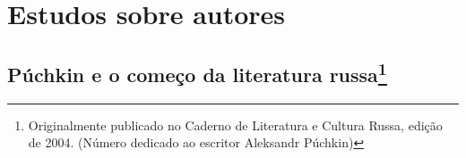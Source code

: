 















\part{Estudos sobre autores}

\chapter{Púchkin e o começo da literatura russa\footnote{Originalmente publicado no Caderno de Literatura e Cultura Russa, edição de 2004. (Número dedicado ao escritor Aleksandr Púch\-kin)}}

